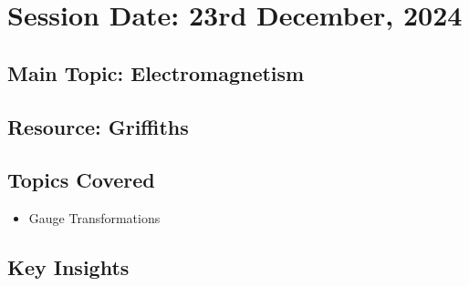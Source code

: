 \section{Session Date: 23rd December, 2024}
\subsection*{Main Topic: Electromagnetism}
\subsection*{Resource: Griffiths}
\subsection*{Topics Covered}
\begin{itemize}
    \item Gauge Transformations
\end{itemize}

\subsection*{Key Insights}
